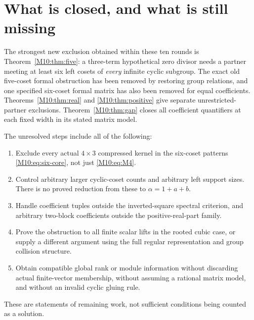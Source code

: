 \documentclass[11pt,a4paper,oneside]{report}
\theoremstyle{definition}
\theoremstyle{remark}
\begin{document}
\section{What is closed, and what is still missing}
The strongest new exclusion obtained within these ten rounds is
Theorem~\ref{M10:thm:five}: a three-term hypothetical zero divisor
needs a partner meeting at least six left cosets of \emph{every}
infinite cyclic subgroup. The exact old five-coset formal obstruction
has been removed by restoring group relations, and one specified
six-coset formal matrix has also been removed for equal coefficients.
Theorems~\ref{M10:thm:real} and \ref{M10:thm:positive} give separate
unrestricted-partner exclusions. Theorem~\ref{M10:thm:gap} closes all
coefficient quantifiers at each fixed width in its stated matrix
model.

The unresolved steps include all of the following:
\begin{enumerate}
\item Exclude every actual $4\times3$ compressed kernel in the
six-coset patterns \eqref{M10:eq:six-core}, not just \eqref{M10:eq:M4}.
\item Control arbitrary larger cyclic-coset counts and arbitrary
left support sizes. There is no proved reduction from these to
$\alpha=1+a+b$.
\item Handle coefficient tuples outside the inverted-square
spectral criterion, and arbitrary two-block coefficients outside
the positive-real-part family.
\item Prove the obstruction to all finite scalar lifts in the rooted
cubic case, or supply a different argument using the full regular
representation and group collision structure.
\item Obtain compatible global rank or module information without
discarding actual finite-vector membership, without assuming a
rational matrix model, and without an invalid cyclic gluing rule.
\end{enumerate}
These are statements of remaining work, not sufficient conditions
being counted as a solution.
\end{document}
